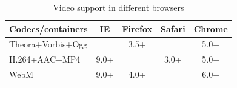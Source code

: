 \begin{table}\centering
\begin{tabular}{@{}lcccc@{}} \toprule
Codecs/containers & IE & Firefox & Safari & Chrome \\ \midrule
Theora+Vorbis+Ogg & ~                 & 3.5+    & ~      & 5.0+   \\ 
H.264+AAC+MP4     & 9.0+              & ~       & 3.0+   & 5.0+   \\ 
WebM              & 9.0+              & 4.0+    & ~      & 6.0+   \\ \bottomrule
\end{tabular}
\caption{Video support in different browsers \citep{pilgrim2010html5}}
\label{tab:videosupport}
\end{table}












